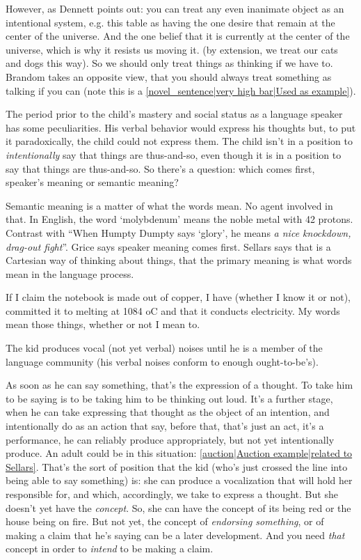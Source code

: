 However, as Dennett points out: you can treat any even inanimate object as an intentional system, e.g. this table as having the one desire that remain at the center of the universe. And the one belief that it is currently at the center of the universe, which is why it resists us moving it. (by extension, we treat our cats and dogs this way). So we should only treat things as thinking if we have to. Brandom takes an opposite view, that you should always treat something as talking if you can (note this is a \ref{novel_sentence|very high bar|Used as example}).



The period prior to the child's mastery and social status as a language speaker has some peculiarities. His verbal behavior would express his thoughts but, to put it paradoxically, the child could not express them. The child isn't in a position to \emph{intentionally} say that things are thus-and-so, even though it is in a position to say that things are thus-and-so. So there's a question: which comes first, speaker's meaning or semantic meaning?

Semantic meaning is a matter of what the words mean. No agent involved in that. In English, the word `molybdenum' means the noble metal with 42 protons. Contrast with ``When Humpty Dumpty says `glory', he means \emph{a nice knockdown, drag-out fight}''. Grice says speaker meaning comes first. Sellars says that is a Cartesian way of thinking about things, that the primary meaning is what words mean in the language process.

If I claim the notebook is made out of copper, I have (whether I know it or not), committed it to melting at 1084 oC and that it conducts electricity. My words mean those things, whether or not I mean to.

The kid produces vocal (not yet verbal) noises until he is a member of the language community (his verbal noises conform to enough ought-to-be's).

As soon as he can say something, that's the expression of a thought. To take him to be saying is to be taking him to be thinking out loud. It's a further stage, when he can take expressing that thought as the object of an intention, and intentionally do as an action that say, before that, that's just an act, it's a performance, he can reliably produce appropriately, but not yet intentionally produce. An adult could be in this situation: \ref{auction|Auction example|related to Sellars}. That's the sort of position that the kid (who's just crossed the line into being able to say something) is: she can produce a vocalization that will hold her responsible for, and which, accordingly, we take to express a thought. But she doesn't yet have the \emph{concept}. So, she can have the concept of its being red or the house being on fire. But not yet, the concept of \emph{endorsing something}, or of making a claim that he's saying can be a later development. And you need \emph{that} concept in order to \emph{intend} to be making a claim.

